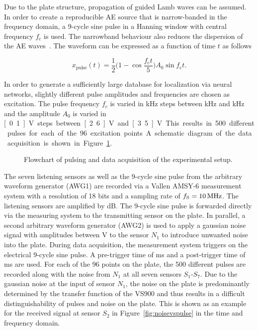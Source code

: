 \documentclass{ieeeaccess}
\newlength\singlefigurewidth
\newlength\figurewidth
\newcommand{\includetikz}[1]{%
	\tikzsetnextfilename{#1}%
}
\begin{document}
Due to the plate structure, propagation of guided Lamb waves can be assumed. In order to create a reproducible AE source that is narrow-banded in the frequency domain, a 9-cycle sine pulse in a Hanning window with central frequency $f_\mathrm{c}$ is used. The narrowband behaviour also reduces the dispersion of the AE waves~\cite{hannwindowsine}. The waveform can be expressed as a function of time $t$ as follows

\begin{equation}
x_\mathrm{pulse}(t) = \frac{1}{2} \Big(1-\cos{\frac{f_\mathrm{c} t}{5}} \Big) A_0 \sin{f_\mathrm{c} t}.
\end{equation}

In order to generate a sufficiently large database for localization via neural networks, slightly different pulse amplitudes and frequencies are chosen as excitation. The pulse frequency $f_c$ is varied in \unit[1]{kHz} steps between \unit[300]{kHz} and \unit[349]{kHz} and the amplitude $A_0$ is varied in \unit[0.1]{V} steps between \unit[2.6]{V} and \unit[3.5]{V}. This results in 500 different pulses for each of the 96 excitation points. A schematic diagram of the data acquisition is shown in Figure~\ref{fig:dataacq}. 

\begin{figure}[htb]
   \def\svgwidth{1.08\singlefigurewidth}
\centering
   \includetikz{pics/setup_data_acq.eps_tex}
\caption{Flowchart of pulsing and data acquisition of the experimental setup.}
\label{fig:dataacq}
\end{figure}

The seven listening sensors as well as the 9-cycle sine pulse from the arbitrary waveform generator (AWG1) are recorded via a Vallen AMSY-6 measurement system with a resolution of 18 bits and a sampling rate of $f_\mathrm{S} = \unit[10]{MHz}$. The listening sensors are amplified by \unit[34]{dB}. The 9-cycle sine pulse is forwarded directly via the measuring system to the transmitting sensor on the plate. In parallel, a second arbitrary waveform generator (AWG2) is used to apply a gaussian noise signal with amplitudes between \unit[0-3]{V} to the sensor $N_1$ to introduce unwanted noise into the plate. During data acquisition, the measurement system triggers on the electrical 9-cycle sine pulse. A pre-trigger time of \unit[10]{ms} and a post-trigger time of \unit[90]{ms} are used. For each of the 96 points on the plate, the 500 different pulses are recorded along with the noise from $N_1$ at all seven sensors $S_1$-$S_7$. Due to the gaussian noise at the input of sensor $N_1$, the noise on the plate is predominantly determined by the transfer function of the VS900 and thus results in a difficult distinguishability of pulses and noise on the plate. This is shown as an example for the received signal at sensor $S_2$ in Figure~\ref{fig:noisevspulse} in the time and frequency domain.
\end{document}
